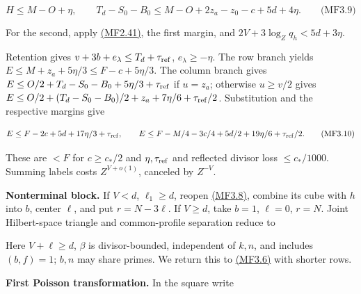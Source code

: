 \hypertarget{mf:eq:B3.9}{}

\label{mf:eq:B3.9}

\[
H\le M-O+\eta,\qquad
T_d-S_0-B_0\le M-O+2z_a-z_0-c+5d+4\eta.
\qquad\text{(MF3.9)}
\]

For the second, apply \protect\hyperlink{mf:eq:B2.41}{(MF2.41)}, the first margin, and \(2V+3\log_Zq_h<5d+3\eta\).

Retention gives \(v+3b+e_\lambda\le T_d+\tau_{\rm ref}\), \(e_\lambda\ge-\eta\). The row branch yields \(E\le M+z_a+5\eta/3\le F-c+5\eta/3\). The column branch gives \(E\le O/2+T_d-S_0-B_0+5\eta/3+\tau_{\rm ref}\) if \(u=z_a\); otherwise \(u\ge v/2\) gives \(E\le O/2+(T_d-S_0-B_0)/2+z_a+7\eta/6+\tau_{\rm ref}/2\). Substitution and the respective margins give

\hypertarget{mf:eq:B3.10}{}

\label{mf:eq:B3.10}

\[
E\le F-2c+5d+17\eta/3+\tau_{\rm ref},\qquad
E\le F-M/4-3c/4+5d/2+19\eta/6+\tau_{\rm ref}/2.
\qquad\text{(MF3.10)}
\]

These are \(<F\) for \(c\ge c_*/2\) and \(\eta,\tau_{\rm ref}\) and reflected divisor loss \(\le c_*/1000\). Summing labels costs \(Z^{V+o(1)}\), canceled by \(Z^{-V}\).

\textbf{Nonterminal block.} If \(V<d\), \(\ell_1\ge d\), reopen \protect\hyperlink{mf:eq:B3.8}{(MF3.8)}, combine its cube with \(h\) into \(b\), center \(\ell\), and put \(r=N-3\ell\). If \(V\ge d\), take \(b=1\), \(\ell=0\), \(r=N\). Joint Hilbert-space triangle and common-profile separation reduce to

\hypertarget{mf:eq:B3.11}{}

\label{mf:eq:B3.11}

\par\noindent{}\par

Here \(V+\ell\ge d\), \(\beta\) is divisor-bounded, independent of \(k,n\), and includes \((b,f)=1\); \(b,n\) may share primes. We return this to \protect\hyperlink{mf:eq:B3.6}{(MF3.6)} with shorter rows.

\textbf{First Poisson transformation.} In the square write

